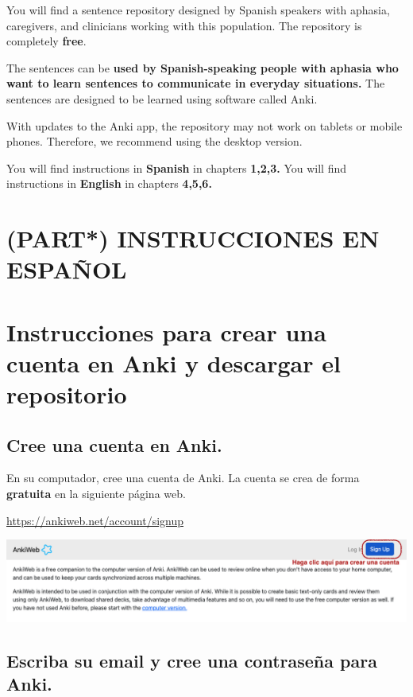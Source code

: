 \documentclass[
]{book}
\begin{document}
You will find a sentence repository designed by Spanish speakers with aphasia, caregivers, and clinicians working with this population. The repository is completely \textbf{free}.

The sentences can be \textbf{used by Spanish-speaking people with aphasia who want to learn sentences to communicate in everyday situations.} The sentences are designed to be learned using software called Anki.

With updates to the Anki app, the repository may not work on tablets or mobile phones. Therefore, we recommend using the desktop version.

You will find instructions in \textbf{Spanish} in chapters \textbf{1,2,3.}
You will find instructions in \textbf{English} in chapters \textbf{4,5,6.}

\chapter*{\texorpdfstring{(PART*) \textbf{INSTRUCCIONES EN ESPAÑOL}}{(PART*) INSTRUCCIONES EN ESPAÑOL}}\label{part-instrucciones-en-espauxf1ol}

\chapter{Instrucciones para crear una cuenta en Anki y descargar el repositorio}\label{cross_0}

\section{Cree una cuenta en Anki.}\label{cree-una-cuenta-en-anki.}

En su computador, cree una cuenta de Anki. La cuenta se crea de forma \textbf{gratuita} en la siguiente página web.

\url{https://ankiweb.net/account/signup}

\includegraphics[width=0.9\linewidth]{images/reposit_sp/sign_up}

\section{Escriba su email y cree una contraseña para Anki.}\label{cross_1}
\end{document}
